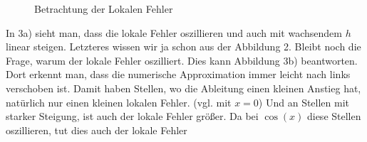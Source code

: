 \documentclass{article}
\begin{document}
	\begin{figure}[H]
		\centering
		\quad
		\caption{Betrachtung der Lokalen Fehler}
	\end{figure}
	In 3a) sieht man, dass die lokale Fehler oszillieren und auch mit wachsendem $h$ linear steigen. Letzteres wissen wir ja schon aus der Abbildung 2. Bleibt noch die Frage, warum der lokale Fehler oszilliert. Dies kann Abbildung 3b) beantworten. Dort erkennt man, dass die numerische Approximation immer leicht nach links verschoben ist. Damit haben Stellen, wo die Ableitung einen kleinen Anstieg hat, natürlich nur einen kleinen lokalen Fehler. (vgl. mit $x=0$) Und an Stellen mit starker Steigung, ist auch der lokale Fehler größer. Da bei $\cos(x)$ diese Stellen oszillieren, tut dies auch der lokale Fehler
	
	
\end{document}
